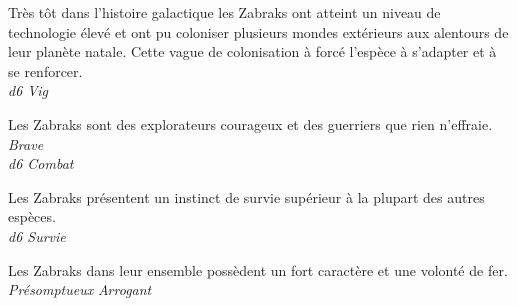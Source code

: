 \begin{description}[align=left]
\item [Endurance] 				%
	Très tôt dans l'histoire galactique les Zabraks ont atteint un niveau de technologie élevé et ont pu coloniser plusieurs mondes extérieurs aux alentours de leur planète natale. Cette vague de colonisation à forcé l'espèce à s'adapter et à se renforcer.\\
	\emph{d6 Vig}
\item [Braveheart] 				%
	Les Zabraks sont des explorateurs courageux et des guerriers que rien n'effraie.\\
	\emph{Brave}\\
	\emph{d6 Combat}
\item [Survivor] 				%
	Les Zabraks présentent un instinct de survie supérieur à la plupart des autres espèces.\\
	\emph{d6 Survie}
\item [Survivor] 				%
	Les Zabraks dans leur ensemble possèdent un fort caractère et une volonté de fer.\\
	\emph{Présomptueux}
	\emph{Arrogant}
\end{description}